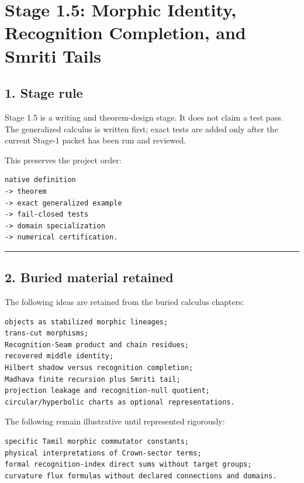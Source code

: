 \hypertarget{stage-1.5-morphic-identity-recognition-completion-and-smriti-tails}{%
\chapter{Stage 1.5: Morphic Identity, Recognition Completion, and Smriti Tails}\label{stage-1.5-morphic-identity-recognition-completion-and-smriti-tails}}

\hypertarget{stage-rule}{%
\section{1. Stage rule}\label{stage-rule}}

Stage 1.5 is a writing and theorem-design stage. It does not claim a test pass.
The generalized calculus is written first; exact tests are added only after the
current Stage-1 packet has been run and reviewed.

This preserves the project order:

\begin{verbatim}
native definition
-> theorem
-> exact generalized example
-> fail-closed tests
-> domain specialization
-> numerical certification.
\end{verbatim}

\begin{center}\rule{0.5\linewidth}{0.5pt}\end{center}

\hypertarget{buried-material-retained}{%
\section{2. Buried material retained}\label{buried-material-retained}}

The following ideas are retained from the buried calculus chapters:

\begin{verbatim}
objects as stabilized morphic lineages;
trans-cut morphisms;
Recognition-Seam product and chain residues;
recovered middle identity;
Hilbert shadow versus recognition completion;
Madhava finite recursion plus Smriti tail;
projection leakage and recognition-null quotient;
circular/hyperbolic charts as optional representations.
\end{verbatim}

The following remain illustrative until represented rigorously:

\begin{verbatim}
specific Tamil morphic commutator constants;
physical interpretations of Crown-sector terms;
formal recognition-index direct sums without target groups;
curvature flux formulas without declared connections and domains.
\end{verbatim}

